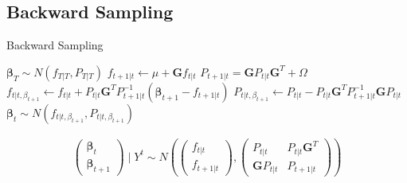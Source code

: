 \documentclass[11pt]{article}
\numberwithin{equation}{section} %
\numberwithin{figure}{section} %
\numberwithin{table}{section} %
\begin{document}
\subsection{Backward Sampling}
\begin{algorithm}[H]
  \caption{Backward Sampling}\label{backsamp}
  \begin{algorithmic}[1]
    	\State $\bm{\beta}_{T}\sim N\left(f_{T|T},P_{T|T}\right)$
    	\State $f_{t+1|t}\gets \mu + \mathbf{G}f_{t|t}$
    	\State $P_{t+1|t}=\mathbf{G}P_{t|t}\mathbf{G}^{T}+\Omega$
    	\State $f_{t|t,\beta_{t+1}}\gets f_{t|t}+P_{t|t}\mathbf{G}^{T}P_{t+1|t}^{-1}\left(\bm{\beta}_{t+1}-f_{t+1|t}\right)$
    	\State $P_{t|t,\beta_{t+1}}\gets P_{t|t}-P_{t|t}\mathbf{G}^{T}P_{t+1|t}^{-1}\mathbf{G}P_{t|t}$
    	\State $\bm{\beta}_{t} \sim N\left(f_{t|t,\beta_{t+1}}, P_{t|t, \beta_{t+1}}\right)$
    	\EndFor
    \EndProcedure
  \end{algorithmic}
\end{algorithm}
\begin{equation}
	\begin{split}
		\begin{pmatrix}
			\bm{\beta}_{t}\\
			\bm{\beta}_{t+1}
		\end{pmatrix}\mid Y^{t} \sim N \left(\begin{pmatrix}
			f_{t|t}\\
			f_{t+1|t}
		\end{pmatrix},
		\begin{pmatrix}
			P_{t|t} & P_{t|t}\mathbf{G}^{T}\\
			\mathbf{G}P_{t|t} & P_{t+1|t}
		\end{pmatrix}\right)
	\end{split}
\end{equation}
% 
% 
\end{document}
